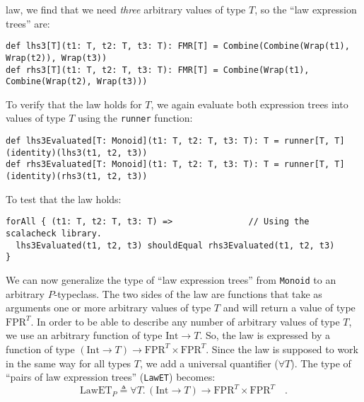 law, we find that we need \emph{three} arbitrary values of type $T$,
so the \textsf{``}law expression trees\textsf{''} are:
\begin{lstlisting}
def lhs3[T](t1: T, t2: T, t3: T): FMR[T] = Combine(Combine(Wrap(t1), Wrap(t2)), Wrap(t3))
def rhs3[T](t1: T, t2: T, t3: T): FMR[T] = Combine(Wrap(t1), Combine(Wrap(t2), Wrap(t3)))
\end{lstlisting}
To verify that the law holds for $T$, we again evaluate both expression
trees into values of type $T$ using the \lstinline!runner!
function:
\begin{lstlisting}
def lhs3Evaluated[T: Monoid](t1: T, t2: T, t3: T): T = runner[T, T](identity)(lhs3(t1, t2, t3))
def rhs3Evaluated[T: Monoid](t1: T, t2: T, t3: T): T = runner[T, T](identity)(rhs3(t1, t2, t3))
\end{lstlisting}
To test that the law holds:
\begin{lstlisting}
forAll { (t1: T, t2: T, t3: T) =>               // Using the scalacheck library.
  lhs3Evaluated(t1, t2, t3) shouldEqual rhs3Evaluated(t1, t2, t3)
}
\end{lstlisting}
We can now generalize the type of \textsf{``}law expression trees\textsf{''} from
\lstinline!Monoid! to an
arbitrary $P$-typeclass. The two sides of the law are functions that
take as arguments one or more arbitrary values of type $T$ and will
return a value of type $\text{FPR}^{T}$. In order to be able to describe
any number of arbitrary values of type $T$, we use an arbitrary function
of type $\text{Int}\rightarrow T$. So, the law is expressed by a
function of type $(\text{Int}\rightarrow T)\rightarrow\text{FPR}^{T}\times\text{FPR}^{T}$.
Since the law is supposed to work in the same way for all types $T$,
we add a universal quantifier ($\forall T$). The type of \textsf{``}pairs
of law expression trees\textsf{''} (\lstinline!LawET!)
becomes:
\begin{equation}
\text{LawET}_{P}\triangleq\forall T.\,(\text{Int}\rightarrow T)\rightarrow\text{FPR}^{T}\times\text{FPR}^{T}\quad.\label{eq:law-expression-tree-type}
\end{equation}

